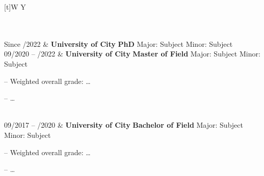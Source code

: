 \begin{xltabular}{\textwidth}[t]{W Y}

 \hrulefill \\ \\ 

Since /2022 			&	\textbf{University of City} \newline
						\textbf{PhD} \newline
						Major: Subject \newline
						Minor: Subject \newline
						\\
					
09/2020 – /2022 			&	\textbf{University of City} \newline
						\textbf{Master of Field} \newline
						Major: Subject \newline
						Minor: Subject
						\begin{compactitem}
							\item[–] Weighted overall grade: \dots
							\item[–] \dots
						\end{compactitem}
						\\
					
09/2017 – /2020 			&	\textbf{University of City} \newline
						\textbf{Bachelor of Field} \newline
						Major: Subject \newline
						Minor: Subject
						\begin{compactitem}
							\item[–] Weighted overall grade: \dots
							\item[–] \dots
						\end{compactitem}
						\\

\end{xltabular}